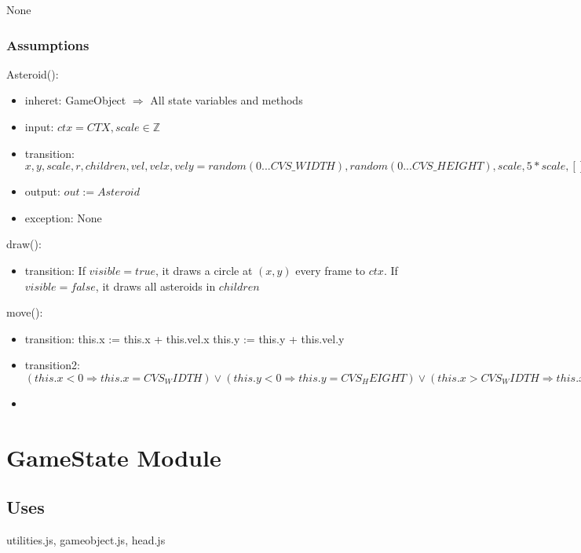 \documentclass[12pt]{article}
\begin{document}
None

\subsubsection* {Assumptions}

Asteroid():
\begin{itemize}
    \item inheret: GameObject $\Rightarrow$ All state variables and methods
    \item input: $ctx = CTX, scale \in \mathbb{Z}$
    \item transition: $ x, y, scale, r, children, vel, velx, vely = random(0...CVS\_WIDTH), random(0...CVS\_HEIGHT),
    scale,
    5*scale,
    [],
    random(-1...1) * 3,
    random(-1...1) * 3$
    \item output: $out := Asteroid$
    \item exception: None
\end{itemize}

draw():
\begin{itemize}
  \item transition: If $visible = true$, it draws a circle at $(x,y)$ every frame to $ctx$. If $visible = false$, it draws all asteroids in $children$
\end{itemize}

move():
\begin{itemize}
  \item transition: this.x := this.x + this.vel.x \land this.y := this.y + this.vel.y
  \item transition2: $(this.x < 0 \Rightarrow this.x = CVS_WIDTH) \lor (this.y < 0 \Rightarrow this.y = CVS_HEIGHT) \lor (this.x > CVS_WIDTH \Rightarrow this.x = 0) \lor (this.y > CVS_HEIGHT \Rightarrow this.y = 0)$
  \item
\end{itemize}


\newpage

\section*{GameState Module}

\subsection*{Uses}

utilities.js, gameobject.js, head.js\\
\end{document}
